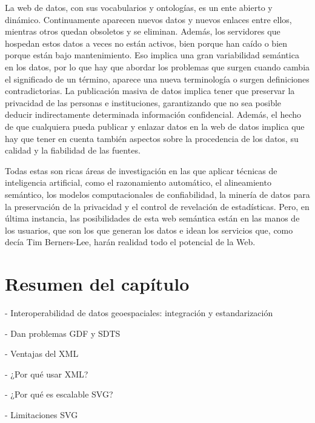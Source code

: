 La web de datos, con sus vocabularios y ontologías, es un ente abierto y dinámico. Continuamente aparecen nuevos datos y nuevos enlaces entre ellos, mientras otros quedan obsoletos y se eliminan. Además, los servidores que hospedan estos datos a veces no están activos, bien porque han caído o bien porque están bajo mantenimiento. Eso implica una gran variabilidad semántica en los datos, por lo que hay que abordar los problemas que surgen cuando cambia el significado de un término, aparece una nueva terminología o surgen definiciones contradictorias. La publicación masiva de datos implica tener que preservar la privacidad de las personas e instituciones, garantizando que no sea posible deducir indirectamente determinada información confidencial. Además, el hecho de que cualquiera pueda publicar y enlazar datos en la web de datos implica que hay que tener en cuenta también aspectos sobre la procedencia de los datos, su calidad y la fiabilidad de las fuentes.

Todas estas son ricas áreas de investigación en las que aplicar técnicas de inteligencia artificial, como el razonamiento automático, el alineamiento semántico, los modelos computacionales de confiabilidad, la minería de datos para la preservación de la privacidad y el control de revelación de estadísticas. Pero, en última instancia, las posibilidades de esta web semántica están en las manos de los usuarios, que son los que generan los datos e idean los servicios que, como decía Tim Berners-Lee, harán realidad todo el potencial de la Web.

\section{Resumen del capítulo}

- Interoperabilidad de datos geoespaciales: integración y estandarización

- Dan problemas GDF y SDTS

- Ventajas del XML

- ¿Por qué usar XML?

- ¿Por qué es escalable SVG?

- Limitaciones SVG

